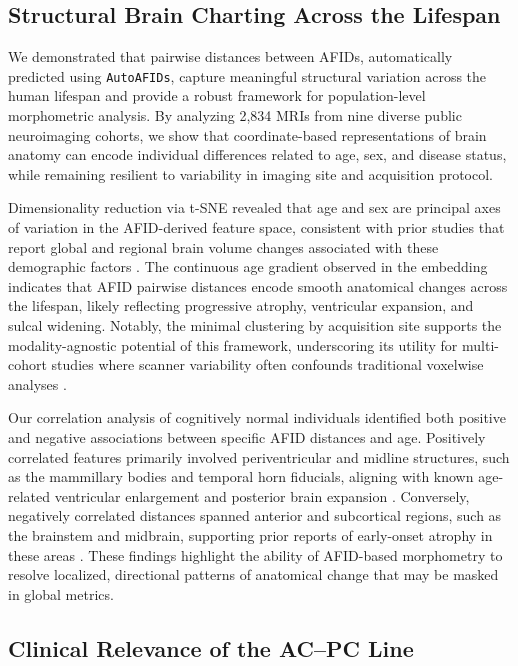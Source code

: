\subsection{Structural Brain Charting Across the Lifespan}
We demonstrated that pairwise distances between AFIDs, automatically predicted using \texttt{AutoAFIDs}, capture meaningful structural variation across the human lifespan and provide a robust framework for population-level morphometric analysis. By analyzing 2,834 MRIs from nine diverse public neuroimaging cohorts, we show that coordinate-based representations of brain anatomy can encode individual differences related to age, sex, and disease status, while remaining resilient to variability in imaging site and acquisition protocol.

Dimensionality reduction via t-SNE revealed that age and sex are principal axes of variation in the AFID-derived feature space, consistent with prior studies that report global and regional brain volume changes associated with these demographic factors \cite{Fjell2010-brainaging, Ritchie2018-sexbrain}. The continuous age gradient observed in the embedding indicates that AFID pairwise distances encode smooth anatomical changes across the lifespan, likely reflecting progressive atrophy, ventricular expansion, and sulcal widening. Notably, the minimal clustering by acquisition site supports the modality-agnostic potential of this framework, underscoring its utility for multi-cohort studies where scanner variability often confounds traditional voxelwise analyses \cite{Fortin2018-harmonization}.

Our correlation analysis of cognitively normal individuals identified both positive and negative associations between specific AFID distances and age. Positively correlated features primarily involved periventricular and midline structures, such as the mammillary bodies and temporal horn fiducials, aligning with known age-related ventricular enlargement and posterior brain expansion \cite{Resnick2003-agingMRI}. Conversely, negatively correlated distances spanned anterior and subcortical regions, such as the brainstem and midbrain, supporting prior reports of early-onset atrophy in these areas \cite{Raz2005-brainatrophy}. These findings highlight the ability of AFID-based morphometry to resolve localized, directional patterns of anatomical change that may be masked in global metrics.

\subsection{Clinical Relevance of the AC–PC Line}

